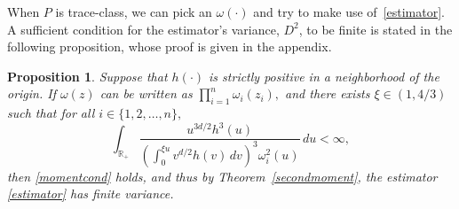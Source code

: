 \documentclass[11pt]{article}
\newtheorem{proposition}[theorem]{Proposition}
\begin{document}
	When $P$ is trace-class, we can pick an $\omega(\cdot)$ and
	try to make use of~\eqref{estimator}. A sufficient condition
	for the estimator's variance, $D^2$, to be finite is stated in the
	following proposition, whose proof is given in the appendix.
	\begin{proposition} \label{nongaussianmoment} Suppose that
		$h(\cdot)$ is strictly positive in a neighborhood of the
		origin.  If $\omega(z)$ can be written as $\prod_{i=1}^{n}
		\omega_i(z_i),$ and there exists $\xi \in (1,4/3)$ such that
		for all $i \in \{1,2,\dots,n\},$
		\begin{equation} \label{nongaussianomega}
		\int_{\mathbb{R}_+} \frac{u^{3d/2}h^3(u)} {(\int_{0}^{\xi u} v^{d/2}h(v) \, dv)^3 \omega_i^2(u) } \, du < \infty,
		\end{equation}
		then \eqref{momentcond} holds, and thus by Theorem~\ref{secondmoment}, the estimator \eqref{estimator} has finite variance.
	\end{proposition}
	
\end{document}
